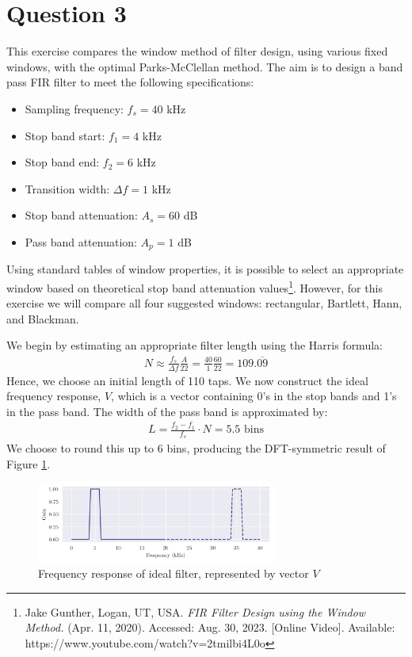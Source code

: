 \section*{Question 3}

This exercise compares the window method of filter design, using various fixed windows, with the optimal Parks-McClellan method. The aim is to design a band pass FIR filter to meet the following specifications:
\begin{multicols}{2}
    \begin{itemize}
        \item Sampling frequency: $f_s=40$ kHz
        \item Stop band start: $f_1=4$ kHz
        \item Stop band end: $f_2=6$ kHz
        \item Transition width: $\Delta f=1$ kHz
        \item Stop band attenuation: $A_s=60$ dB
        \item Pass band attenuation: $A_p=1$ dB
    \end{itemize}
\end{multicols}
Using standard tables of window properties, it is possible to select an appropriate window based on theoretical stop band attenuation values\footnote{Jake Gunther, Logan, UT, USA. \textit{FIR Filter Design using the Window Method.} (Apr. 11, 2020). Accessed: Aug. 30, 2023. [Online Video]. Available: https://www.youtube.com/watch?v=2tmilbi4L0o}. However, for this exercise we will compare all four suggested windows: rectangular, Bartlett, Hann, and Blackman.

We begin by estimating an appropriate filter length using the Harris formula:
\begin{align}
    N \approx \frac{f_s}{\Delta f} \frac{A}{22} = \frac{40}{1} \frac{60}{22} = 109.\overline{09}
\end{align}
Hence, we choose an initial length of 110 taps. We now construct the ideal frequency response, $V$, which is a vector containing 0's in the stop bands and 1's in the pass band. The width of the pass band is approximated by:
\begin{align}
    L = \frac{f_2 - f_1}{f_s} \cdot N = 5.5 \text{ bins}
\end{align}
We choose to round this up to 6 bins, producing the DFT-symmetric result of Figure \ref{fig:q3_ideal_freqz}.

\begin{figure}[ht]
    \centering
    \includegraphics[width=0.7\textwidth]{images/q3_ideal_freqz.png}
    \caption{Frequency response of ideal filter, represented by vector $V$}
    \label{fig:q3_ideal_freqz}
\end{figure}

